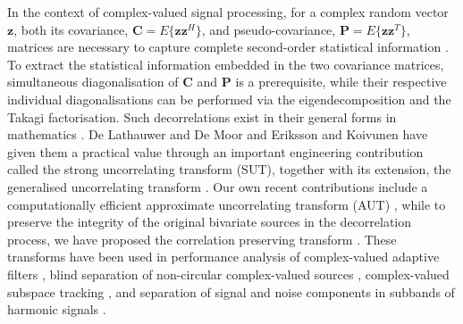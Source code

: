 \documentclass[review]{elsarticle}
\theoremstyle{plain}
\theoremstyle{remark}
\theoremstyle{plain}
\theoremstyle{definition}
\theoremstyle{prop}
\theoremstyle{definition}
\theoremstyle{plain}
\theoremstyle{plain}
\begin{document}
In the context of complex-valued signal processing, for a complex random vector $\mathbf{z}$, both its covariance, $\mathbf{C}=E\{\mathbf{zz}^H\}$, and pseudo-covariance, $\mathbf{P}=E\{\mathbf{zz}^T\}$, matrices are necessary to capture complete second-order statistical information \cite{Mandic2009}. To extract the statistical information embedded in the two covariance matrices, simultaneous diagonalisation of $\mathbf{C}$ and $\mathbf{P}$ is a prerequisite, while their respective individual diagonalisations can be performed via the eigendecomposition and the Takagi factorisation. Such decorrelations exist in their general forms in mathematics \cite{horn1990matrix}. De Lathauwer and De Moor \cite{de2002} and Eriksson and Koivunen \cite{Eriksson2006} have given them a practical value through an important engineering contribution called the strong uncorrelating transform (SUT), together with its extension, the generalised uncorrelating transform \cite{Ollila2009}. Our own recent contributions include a computationally efficient approximate uncorrelating transform (AUT) \cite{CheongTook2012}, while to preserve the integrity of the original bivariate sources in the decorrelation process, we have proposed the correlation preserving transform \cite{CheongTook2015}. These transforms have been used in performance analysis of complex-valued adaptive filters \cite{douglas2010performance,mandic2015mean,xia2017complementary,xia2017full}, blind separation of non-circular complex-valued sources \cite{shen2010complex,Ramírez2012}, complex-valued subspace tracking \cite{Douglas2006}, and separation of signal and noise components in subbands of harmonic signals \cite{Okopal2015}.
\end{document}

